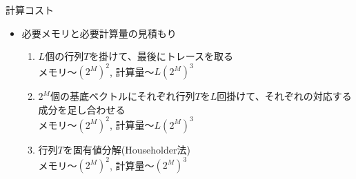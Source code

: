 \begin{frame}[t,fragile]{計算コスト}
  \begin{itemize}
    \setlength{\itemsep}{1em}
  \item 必要メモリと必要計算量の見積もり
    \begin{enumerate}
    \item $L$個の行列$T$を掛けて、最後にトレースを取る \\
      メモリ〜$(2^M)^2$, 計算量〜$L(2^M)^3$
    \item $2^M$個の基底ベクトルにそれぞれ行列$T$を$L$回掛けて、それぞれの対応する成分を足し合わせる \\
      メモリ〜$(2^M)^2$, 計算量〜$L(2^M)^3$
    \item 行列$T$を固有値分解(Householder法) \\
      メモリ〜$(2^M)^2$, 計算量〜$(2^M)^3$
    \end{enumerate}
  \end{itemize}
\end{frame}

